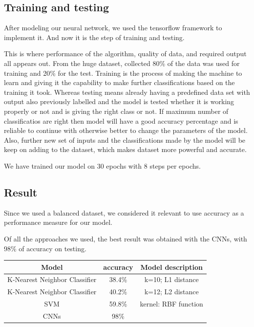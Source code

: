 \documentclass[a4paper, 12pt]{report}
\begin{document}
\subsection{Training and testing}

After modeling our neural network, we used the tensorflow framework to implement it. And now it is the step of training and testing.

This is where performance of the algorithm, quality of data, and required output all appears out. From the huge dataset, collected 80\% of the data was used for training and 20\% for the test. Training is the process of making the machine to learn and giving it the capability to make further classifications based on the training it took. Whereas testing means already having a predefined data set with output also previously labelled and the model is tested whether it is working properly or not and is giving the right class or not. If maximum number of classificatios are right then model will have a good accuracy percentage and is reliable to continue with otherwise better to change the parameters of the model. Also, further new set of inputs and the classifications made by the model will be keep on adding to the dataset, which makes dataset more powerful and accurate. 

We have trained our model on 30 epochs with 8 steps per epochs.

\subsection{Result}

Since we used a balanced dataset, we considered it relevant to use accuracy as a performance measure for our model.

Of all the approaches we used, the best result was obtained with the CNNs, with 98\% of accuracy on testing.

\hspace{50mm}

\begin{tabular}{c c c} \hline
    Model & accuracy & Model description\\ \hline
    K-Nearest Neighbor Classifier & 38.4\% & k=10; L1 distance \\ \hline
    K-Nearest Neighbor Classifier & 40.2\% & k=12; L2 distance \\ \hline
    SVM & 59.8\% & kernel: RBF function \\ \hline
    CNNs & 98\% &  \\ \hline

\end{tabular}
\end{document}
